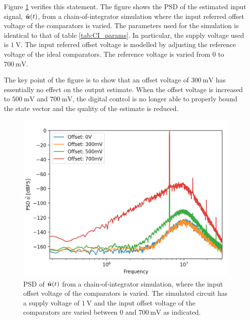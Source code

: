 Figure \ref{fig:offset_sim} verifies this statement. The figure shows the PSD of the estimated input signal, $\hat{\bm{u}}(t)$, from a chain-of-integrator simulation where the input referred offset voltage of the comparators is varied. The parameters used for the simulation is identical to that of table \ref{tab:CI_params}. In particular, the supply voltage used is $\SI{1}{\volt}$. The input referred offset voltage is modelled by adjusting the reference voltage of the ideal comparators. The reference voltage is varied from 0 to $\SI{700}{\milli\volt}$.

The key point of the figure is to show that an offset voltage of $\SI{300}{\milli\volt}$ has essentially no effect on the output estimate. When the offset voltage is increased to $\SI{500}{\milli\volt}$ and $\SI{700}{\milli\volt}$, the digital control is no longer able to properly bound the state vector and the quality of the estimate is reduced.

\begin{figure}[htbp]
    \centering
    \includegraphics[width=\linewidth]{figures/060discussion/offset_sim.png}
    \caption{PSD of $\hat{\bm{u}}(t)$ from a chain-of-integrator simulation, where the input offset voltage of the comparators is varied. The simulated circuit has a supply voltage of $\SI{1}{\volt}$ and the input offset voltage of the comparators are varied between 0 and $\SI{700}{\milli\volt}$ as indicated.}
    \label{fig:offset_sim}
\end{figure}





